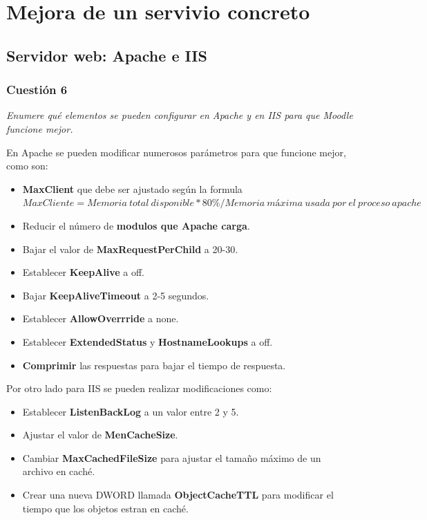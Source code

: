 \section{Mejora de un servivio concreto}
\subsection{Servidor web: Apache e IIS}
\subsubsection{Cuestión 6}
\textit{Enumere qué elementos se pueden configurar en Apache y en IIS para que Moodle funcione mejor.}
\newline

En Apache se pueden modificar numerosos parámetros para que funcione mejor, como son: \cite{moda}
\begin{itemize}
    \item \textbf{MaxClient }que debe ser ajustado según la formula $MaxCliente = Memoria\ total\ disponible * 80 \% / Memoria\ máxima\ usada\ por\ el\ proceso\ apache$
    \item Reducir el número de \textbf{modulos que Apache carga}.
    \item Bajar el valor de \textbf{MaxRequestPerChild} a 20-30.
    \item Establecer \textbf{KeepAlive} a off.
    \item Bajar \textbf{KeepAliveTimeout} a 2-5 segundos.
    \item Establecer \textbf{AllowOverrride} a none.
    \item Establecer \textbf{ExtendedStatus} y \textbf{HostnameLookups} a off.
    \item \textbf{Comprimir} las respuestas para bajar el tiempo de respuesta.
\end{itemize}

Por otro lado para IIS se pueden realizar modificaciones como: \cite{modi}
\begin{itemize}
    \item Establecer \textbf{ListenBackLog} a un valor entre 2 y 5.
    \item Ajustar el valor de \textbf{MenCacheSize}.
    \item Cambiar \textbf{MaxCachedFileSize }para ajustar el tamaño máximo de un archivo en caché.
    \item Crear una nueva DWORD llamada \textbf{ObjectCacheTTL} para modificar el tiempo que los objetos estran en caché.
\end{itemize}

